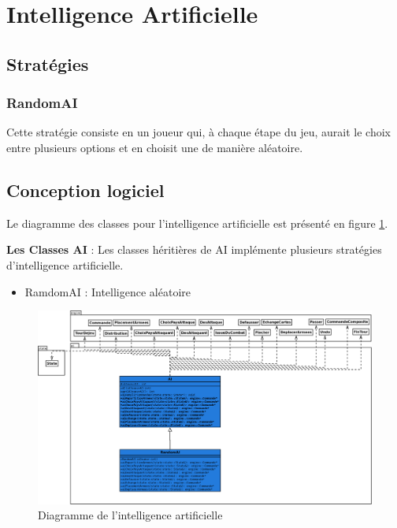 \section{Intelligence Artificielle}

\subsection{Stratégies}

\subsubsection{RandomAI}
Cette stratégie consiste en un joueur qui, à chaque étape du jeu, aurait le choix entre plusieurs options et en choisit une de manière aléatoire.

\newpage
\subsection{Conception logiciel}
Le diagramme des classes pour l’intelligence artificielle est présenté en figure \ref{fig:ai}.

\textbf{Les Classes AI} : Les classes héritières de AI implémente plusieurs stratégies d'intelligence artificielle.
\begin{itemize}
    \item RamdomAI : Intelligence aléatoire
\end{itemize}

\begin{landscape}
    \begin{figure}[!htbp]
        \centering
        \includegraphics[width=17cm]{Images/ai.png}
        \caption{Diagramme de l'intelligence artificielle}
        \label{fig:ai}
    \end{figure}
\end{landscape}

